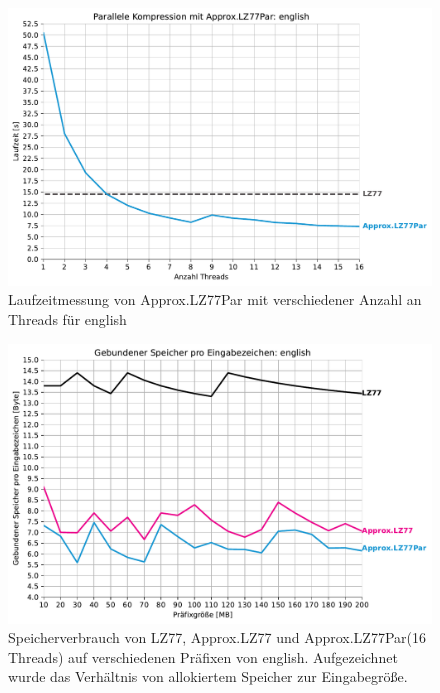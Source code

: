 \begin{figure}[H]
    \centering
    \caption{Laufzeitmessung von Approx.LZ77Par mit verschiedener Anzahl an Threads für english}
    \includegraphics[scale=0.68]{Images/progressive_speedup_english.pdf}
\end{figure}

\begin{figure}[H]
    \centering
    \caption{Speicherverbrauch von LZ77, Approx.LZ77 und Approx.LZ77Par(16 Threads) auf verschiedenen Präfixen von english. Aufgezeichnet wurde das Verhältnis
    von allokiertem Speicher zur Eingabegröße.}
    \includegraphics[scale=0.65]{Images/progressive_mem_english.pdf}
\end{figure}

